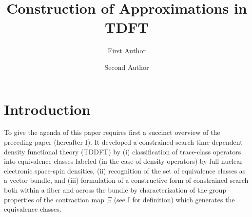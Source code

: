 \documentclass[aps,preprint]{revtex4}%
\begin{document}
\title[TDFT II ]{Construction of Approximations in TDFT }
\author{First Author}
\author{Second Author}

\begin{abstract}


\end{abstract}
\maketitle
\tableofcontents


\section{Introduction}

To give the agenda of this paper requires first a succinct overview of the
preceding paper (hereafter I). It developed a constrained-search
time-dependent density functional theory (TDDFT) by (i) classification of
trace-class operators into equivalence classes labeled (in the case of density
operators) by full nuclear-electronic space-spin densities, (ii) recognition
of the set of equivalence classes as a vector bundle, and (iii) formulation of
a constructive form of constrained search both within a fiber and across the
bundle by characterization of the group properties of the contraction map
$\Xi$ (see I for definition) which generates the equivalence classes.
\end{document}
